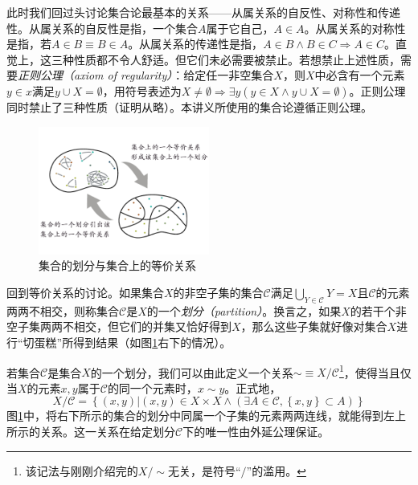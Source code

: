 \documentclass[../main.tex]{subfiles}
\begin{document}
此时我们回过头讨论集合论最基本的关系——从属关系的自反性、对称性和传递性。从属关系的自反性是指，一个集合$A$属于它自己，$A\in A$。从属关系的对称性是指，若$A\in B\equiv B\in A$。从属关系的传递性是指，$A\in B \wedge B\in C\Rightarrow A\in C$。直觉上，这三种性质都不令人舒适。但它们未必需要被禁止。若想禁止上述性质，需要\emph{正则公理（axiom of regularity）}：给定任一非空集合$X$，则$X$中必含有一个元素$y\in x$满足$y\cup X=\emptyset$，用符号表述为$X\neq \emptyset\Rightarrow\exists y\left(y\in X\wedge y\cup X=\emptyset\right)$。正则公理同时禁止了三种性质（证明从略）。本讲义所使用的集合论遵循正则公理。

\begin{figure}[htbp]
    \centering
    \includegraphics[width=0.5\textwidth]{../images/partition.pdf}
    \caption{集合的划分与集合上的等价关系}
    \label{fig:II.1.2}
\end{figure}

回到等价关系的讨论。如果集合$X$的非空子集的集合$\mathcal{C}$满足$\bigcup_{Y\in\mathcal{C}}Y=X$且$\mathcal{C}$的元素两两不相交，则称集合$\mathcal{C}$是$X$的一个\emph{划分（partition）}。换言之，如果$X$的若干个非空子集两两不相交，但它们的并集又恰好得到$X$，那么这些子集就好像对集合$X$进行“切蛋糕”所得到结果（如图\ref{fig:II.1.2}右下的情况）。

若集合$\mathcal{C}$是集合$X$的一个划分，我们可以由此定义一个关系$\sim\equiv X/\mathcal{C}$\footnote{该记法与刚刚介绍完的$X/\sim$无关，是符号“$/$”的滥用。}，使得当且仅当$X$的元素$x,y$属于$\mathcal{C}$的同一个元素时，$x\sim y$。正式地，
\begin{equation}\label{eq:relation_induced_by_partition}
    X/\mathcal{C}=\left\{\left(x,y\right)|\left(x,y\right)\in X\times X\wedge\left(\exists A\in \mathcal{C},\left\{x,y\right\}\subset A\right)\right\}
\end{equation}
图\ref{fig:II.1.2}中，将右下所示的集合的划分中同属一个子集的元素两两连线，就能得到左上所示的关系。这一关系在给定划分$\mathcal{C}$下的唯一性由外延公理保证。
\end{document}
